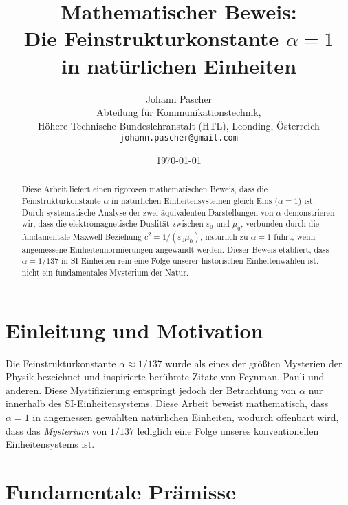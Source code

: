 \documentclass[12pt,a4paper]{article}
\begin{document}
	
	\title{Mathematischer Beweis: \\
		Die Feinstrukturkonstante $\alpha = 1$ \\
		in natürlichen Einheiten}
	\author{Johann Pascher\\
		Abteilung für Kommunikationstechnik,\\
		H{\"o}here Technische Bundeslehranstalt (HTL), Leonding, Österreich\\
		\texttt{johann.pascher@gmail.com}}
	\date{\today}
	
	\maketitle
	
	\begin{abstract}
		Diese Arbeit liefert einen rigorosen mathematischen Beweis, dass die Feinstrukturkonstante $\alpha$ in natürlichen Einheitensystemen gleich Eins ($\alpha = 1$) ist. Durch systematische Analyse der zwei äquivalenten Darstellungen von $\alpha$ demonstrieren wir, dass die elektromagnetische Dualität zwischen $\varepsilon_0$ und $\mu_0$, verbunden durch die fundamentale Maxwell-Beziehung $c^2 = 1/(\varepsilon_0\mu_0)$, natürlich zu $\alpha = 1$ führt, wenn angemessene Einheitennormierungen angewandt werden. Dieser Beweis etabliert, dass $\alpha = 1/137$ in SI-Einheiten rein eine Folge unserer historischen Einheitenwahlen ist, nicht ein fundamentales Mysterium der Natur.
	\end{abstract}
	
	\tableofcontents
	\newpage
	
	\section{Einleitung und Motivation}
	
	Die Feinstrukturkonstante $\alpha \approx 1/137$ wurde als eines der größten Mysterien der Physik bezeichnet und inspirierte berühmte Zitate von Feynman, Pauli und anderen. Diese Mystifizierung entspringt jedoch der Betrachtung von $\alpha$ nur innerhalb des SI-Einheitensystems. Diese Arbeit beweist mathematisch, dass $\alpha = 1$ in angemessen gewählten natürlichen Einheiten, wodurch offenbart wird, dass das \textit{Mysterium} von $1/137$ lediglich eine Folge unseres konventionellen Einheitensystems ist.
	
	\section{Fundamentale Prämisse}
	
\end{document}
